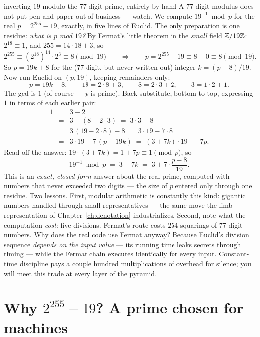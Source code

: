 \begin{worked}{inverting $19$ modulo the 77-digit prime, entirely by hand}
A 77-digit modulus does not put pen-and-paper out of business --- watch.
We compute $19^{-1} \bmod p$ for the real $p = 2^{255}-19$, exactly, in
five lines of Euclid. The only preparation is one residue:
\emph{what is $p$ mod $19$?} By Fermat's little theorem in the
\emph{small} field $\mathbb{Z}/19\mathbb{Z}$: $2^{18} \equiv 1$, and
$255 = 14 \cdot 18 + 3$, so
\[
2^{255} \equiv (2^{18})^{14} \cdot 2^3 \equiv 8 \pmod{19}
\qquad\Longrightarrow\qquad
p = 2^{255} - 19 \equiv 8 - 0 \equiv 8 \pmod{19}.
\]
So $p = 19k + 8$ for the (77-digit, but never-written-out) integer
$k = (p-8)/19$. Now run Euclid on $(p, 19)$, keeping remainders only:
\[
p = 19k + 8, \qquad 19 = 2\cdot 8 + 3, \qquad 8 = 2\cdot 3 + 2,
\qquad 3 = 1\cdot 2 + 1 .
\]
The gcd is $1$ (of course --- $p$ is prime). Back-substitute, bottom to
top, expressing $1$ in terms of each earlier pair:
\[
\begin{array}{lcl}
1 &=& 3 - 2\\
  &=& 3 - (8 - 2\cdot 3) \;=\; 3\cdot 3 - 8\\
  &=& 3\,(19 - 2\cdot 8) - 8 \;=\; 3\cdot 19 - 7\cdot 8\\
  &=& 3\cdot 19 - 7\,(p - 19k) \;=\; (3 + 7k)\cdot 19 \;-\; 7p .
\end{array}
\]
Read off the answer: $19 \cdot (3 + 7k) = 1 + 7p \equiv 1 \pmod p$, so
\[
19^{-1} \bmod p \;=\; 3 + 7k
\;=\; 3 + 7\cdot\frac{p - 8}{19} .
\]
This is an \emph{exact, closed-form} answer about the real prime, computed
with numbers that never exceeded two digits --- the size of $p$ entered
only through one residue. Two lessons. First, modular arithmetic is
constantly this kind: gigantic numbers handled through small
representatives --- the same move the limb representation of
Chapter~\ref{ch:denotation} industrializes. Second, note what the
computation \emph{cost}: five divisions. Fermat's route costs $254$
squarings of 77-digit numbers. Why does the real code use Fermat anyway?
Because Euclid's division sequence \emph{depends on the input value} ---
its running time leaks secrets through timing --- while the Fermat chain
executes identically for every input. Constant-time discipline pays a
couple hundred multiplications of overhead for silence; you will meet
this trade at every layer of the pyramid.
\end{worked}

\section{\texorpdfstring{Why $2^{255}-19$?}{Why 2**255-19?} A prime chosen for machines}

